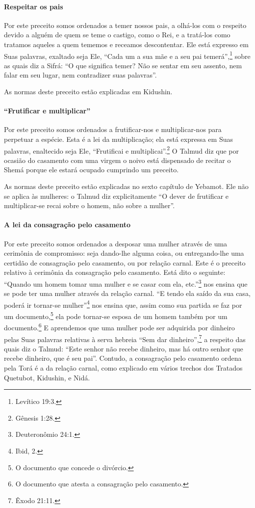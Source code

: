\paragraph{Respeitar os pais}

Por este preceito somos ordenados a temer nossos pais, a olhá-los com o
respeito devido a alguém de quem se teme o castigo, como o Rei, e a
tratá-los como tratamos aqueles a quem tememos e receamos descontentar.
Ele está expresso em Suas palavras, exaltado seja Ele, ``Cada um a sua
mãe e a seu pai temerá'',\footnote{Levítico 19:3.} sobre as quais diz a Sifrá:
``O que significa temer? Não se sentar em seu assento, nem falar em seu
lugar, nem contradizer suas palavras''.

As normas deste preceito estão explicadas em Kidushin.

\paragraph{``Frutificar e multiplicar''}

Por este preceito somos ordenados a frutificar-nos e multiplicar-nos
para perpetuar a espécie. Esta é a lei da multiplicação; ela está
expressa em Suas palavras, enaltecido seja Ele, ``Frutificai e
multiplicai''.\footnote{Gênesis 1:28.} O Talmud diz que por ocasião do casamento
com uma virgem o noivo está dispensado de recitar o Shemá porque ele
estará ocupado cumprindo um preceito.

As normas deste preceito estão explicadas no sexto capítulo de Yebamot.
Ele não se aplica às mulheres: o Talmud diz explicitamente ``O dever de
frutificar e multiplicar-se recai sobre o homem, não sobre a mulher''.

\paragraph{A lei da consagração pelo casamento}

Por este preceito somos ordenados a desposar uma mulher através de uma
cerimônia de compromisso: seja dando-lhe alguma coisa, ou entregando-lhe
uma certidão de consagração pelo casamento, ou por relação carnal. Este
é o preceito relativo à cerimônia da consagração pelo casamento. Está
dito o seguinte: ``Quando um homem tomar uma mulher e se casar com ela,
etc.''\footnote{Deuteronômio 24:1.} nos ensina que se pode ter uma mulher através da relação
carnal. ``E tendo ela saído da sua casa, poderá ir tornar-se mulher''\footnote{Ibid, 2.} nos ensina que, assim como sua partida se faz por um
documento,\footnote{O documento que concede o divórcio.} ela pode tornar-se esposa de um homem
também por um documento.\footnote{O documento que atesta a consagração pelo casamento.} E aprendemos que uma
mulher pode ser adquirida por dinheiro pelas Suas palavras relativas à
serva hebreia ``Sem dar dinheiro'',\footnote{Êxodo 21:11.} a respeito das quais
diz o Talmud: ``Este senhor não recebe dinheiro, mas há outro senhor que
recebe dinheiro, que é seu pai''. Contudo, a consagração pelo casamento
ordena pela Torá é a da relação carnal, como explicado em vários
trechos dos Tratados Quetubot, Kidushin, e Nidá.

